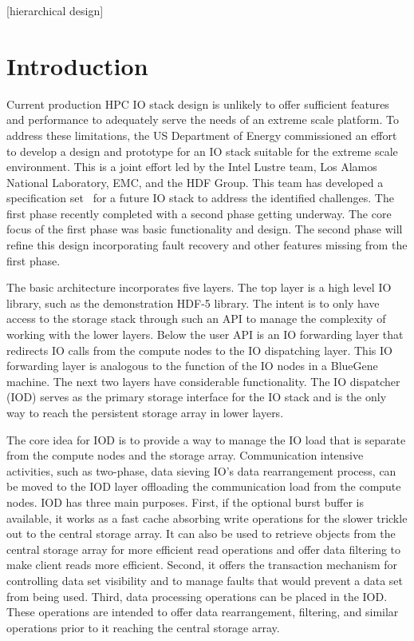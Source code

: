 \documentclass[conference]{sig-alt-gov2}
\begin{document}
[hierarchical design]


\section{Introduction}

Current production HPC IO stack design is unlikely to offer sufficient features
and performance to adequately serve the needs of an extreme scale platform. To
address these limitations, the US Department of Energy commissioned an effort
to develop a design and prototype for an IO stack suitable for the extreme
scale environment. This is a joint effort led by the Intel Lustre team, Los
Alamos National Laboratory, EMC, and the HDF Group. This team has developed a
specification set~\cite{fastforward:2014:docs} for a future IO stack to address
the identified challenges. The first phase recently completed with a second
phase getting underway. The core focus of the first phase was basic
functionality and design. The second phase will refine this design
incorporating fault recovery and other features missing from the first phase.

The basic architecture incorporates five layers. The top layer is a high level
IO library, such as the demonstration HDF-5 library. The intent is to only have
access to the storage stack through such an API to manage the complexity of
working with the lower layers. Below the user API is an IO forwarding layer
that redirects IO calls from the compute nodes to the IO dispatching layer.
This IO forwarding layer is analogous to the function of the IO nodes in a
BlueGene machine. The next two layers have considerable functionality. The IO
dispatcher (IOD) serves as the primary storage interface for the IO stack and
is the only way to reach the persistent storage array in lower layers.

The core idea for IOD is to provide a way to manage the IO load that is
separate from the compute nodes and the storage array. Communication intensive
activities, such as two-phase, data sieving IO's data rearrangement process,
can be moved to the IOD layer offloading the communication load from the
compute nodes. IOD has three main purposes. First, if the optional burst buffer
is available, it works as a fast cache absorbing write operations for the
slower trickle out to the central storage array. It can also be used to
retrieve objects from the central storage array for more efficient read
operations and offer data filtering to make client reads more efficient.
Second, it offers the transaction mechanism for controlling data set visibility
and to manage faults that would prevent a data set from being used. Third, data
processing operations can be placed in the IOD. These operations are intended
to offer data rearrangement, filtering, and similar operations prior to it
reaching the central storage array.
\end{document}
